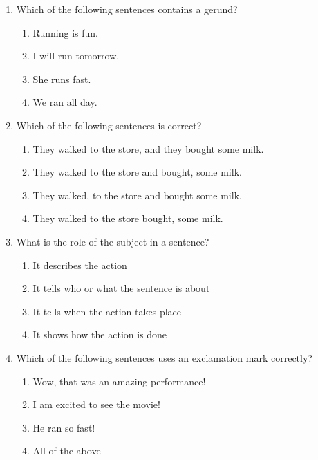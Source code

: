 \documentclass[12pt]{article}
\begin{document}
\begin{enumerate}
    \vspace{0.5cm}

    \item Which of the following sentences contains a gerund?

    \begin{enumerate}[label=\Alph*.]
        \item Running is fun.
        \item I will run tomorrow.
        \item She runs fast.
        \item We ran all day.
    \end{enumerate}

    \vspace{0.5cm}

    \item Which of the following sentences is correct?

    \begin{enumerate}[label=\Alph*.]
        \item They walked to the store, and they bought some milk.
        \item They walked to the store and bought, some milk.
        \item They walked, to the store and bought some milk.
        \item They walked to the store bought, some milk.
    \end{enumerate}

    \vspace{0.5cm}

    \item What is the role of the subject in a sentence?

    \begin{enumerate}[label=\Alph*.]
        \item It describes the action
        \item It tells who or what the sentence is about
        \item It tells when the action takes place
        \item It shows how the action is done
    \end{enumerate}

    \vspace{0.5cm}

    \item Which of the following sentences uses an exclamation mark correctly?

    \begin{enumerate}[label=\Alph*.]
        \item Wow, that was an amazing performance!
        \item I am excited to see the movie!
        \item He ran so fast!
        \item All of the above
    \end{enumerate}

\end{enumerate}
\end{document}
